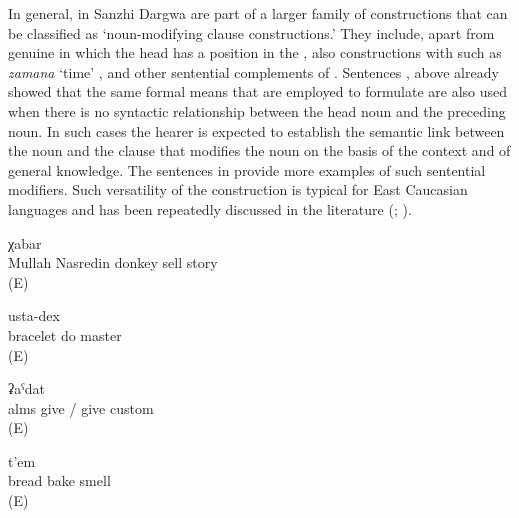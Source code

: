 In general,  in Sanzhi Dargwa are part of a larger family of constructions that can be classified as `noun-modifying clause constructions.' They include, apart from genuine  in which the head has a position in the , also constructions with   such as \textit{zamana} `time' ,  and other sentential complements of . Sentences ,  above already showed that the same formal means that are employed to formulate  are also used when there is no syntactic relationship between the head noun and the preceding noun. In such cases the hearer is expected to establish the semantic link between the noun and the clause that modifies the noun on the basis of the context and of general knowledge. The sentences in  provide more examples of such sentential modifiers. Such versatility of the  construction is typical for East Caucasian languages and has been repeatedly discussed in the literature (\citealp{Daniel.Lander2008, Daniel.Lander2010}; \citealp{Comrie.Forker.Khalilova2017}).
%
\begin{exe}
	\ex	\label{ex:the story that Mulla Nasredin sold a donkey}
		χabar\\
		Mullah	Nasredin	donkey	sell	story\\
	\glt	{} (E)

	\ex	\label{ex:the mastery of making bracelets}
		usta-dex\\
		bracelet	do	master\\
	\glt	{} (E)

	\ex	\label{ex:the tradition of giving alms}
		ʡaˁdat\\
		alms	give	/	give	custom\\
	\glt	{} (E)

	\ex	\label{ex:the smell of baking bread}
	\gll	[t'ult'	b-uc'-an]	t'em\\
		bread	bake	smell\\
	\glt	{} (E)
\end{exe}

